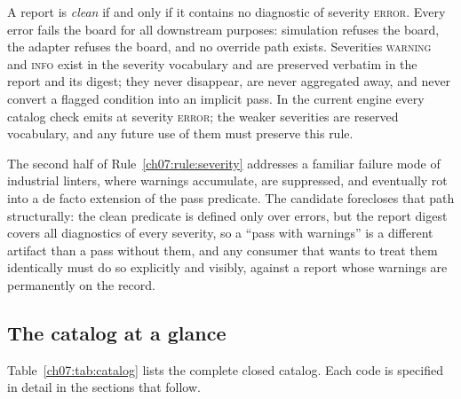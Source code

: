 \begin{ruleenv}\label{ch07:rule:severity}
A report is \emph{clean} if and only if it contains no diagnostic of severity \textsc{error}. Every error fails the board for all downstream purposes: simulation refuses the board, the adapter refuses the board, and no override path exists. Severities \textsc{warning} and \textsc{info} exist in the severity vocabulary and are preserved verbatim in the report and its digest; they never disappear, are never aggregated away, and never convert a flagged condition into an implicit pass. In the current engine every catalog check emits at severity \textsc{error}; the weaker severities are reserved vocabulary, and any future use of them must preserve this rule.
\end{ruleenv}

The second half of Rule~\ref{ch07:rule:severity} addresses a familiar failure mode of industrial linters, where warnings accumulate, are suppressed, and eventually rot into a de facto extension of the pass predicate. The candidate forecloses that path structurally: the clean predicate is defined only over errors, but the report digest covers all diagnostics of every severity, so a ``pass with warnings'' is a different artifact than a pass without them, and any consumer that wants to treat them identically must do so explicitly and visibly, against a report whose warnings are permanently on the record.

\subsection{The catalog at a glance}

Table~\ref{ch07:tab:catalog} lists the complete closed catalog. Each code is specified in detail in the sections that follow.

